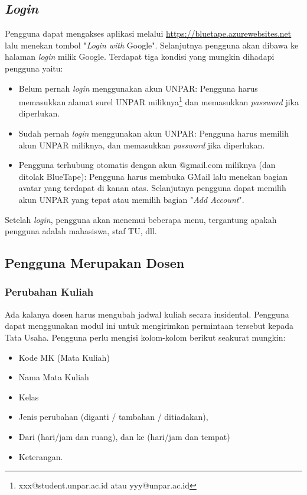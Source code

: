 \subsection{\textit{Login}}
\label{sec:bluetape_login}
Pengguna dapat mengakses aplikasi melalui \url{https://bluetape.azurewebsites.net} lalu menekan tombol "\textit{Login with} Google". Selanjutnya pengguna akan dibawa ke halaman \textit{login} milik Google. Terdapat tiga kondisi yang mungkin dihadapi pengguna yaitu:
\begin{itemize}
	\item Belum pernah \textit{login} menggunakan akun UNPAR: Pengguna harus memasukkan alamat surel UNPAR miliknya\footnote{xxx@student.unpar.ac.id atau yyy@unpar.ac.id} dan memasukkan \textit{password} jika diperlukan.
	\item Sudah pernah \textit{login} menggunakan akun UNPAR: Pengguna harus memilih akun UNPAR miliknya, dan memasukkan \textit{password} jika diperlukan.
	\item Pengguna terhubung otomatis dengan akun @gmail.com miliknya (dan ditolak BlueTape): Pengguna harus membuka GMail lalu menekan bagian avatar yang terdapat di kanan atas. Selanjutnya pengguna dapat memilih akun UNPAR yang tepat atau memilih bagian "\textit{Add Account}".
\end{itemize}

Setelah \textit{login}, pengguna akan menemui beberapa menu, tergantung apakah pengguna adalah mahasiswa, staf TU, dll.

\subsection{Pengguna Merupakan Dosen}
\label{sec:bluetape_dosen}

\subsubsection{Perubahan Kuliah}
\label{sec:bluetape_perubahan_kuliah}
Ada kalanya dosen harus mengubah jadwal kuliah secara insidental. Pengguna dapat menggunakan modul ini untuk mengirimkan permintaan tersebut kepada Tata Usaha. Pengguna perlu mengisi kolom-kolom berikut seakurat mungkin:
\begin{itemize}
	\item Kode MK (Mata Kuliah)
	\item Nama Mata Kuliah
	\item Kelas
	\item Jenis perubahan (diganti / tambahan / ditiadakan),
	\item Dari (hari/jam dan ruang), dan ke (hari/jam dan tempat)
	\item Keterangan.
\end{itemize}

